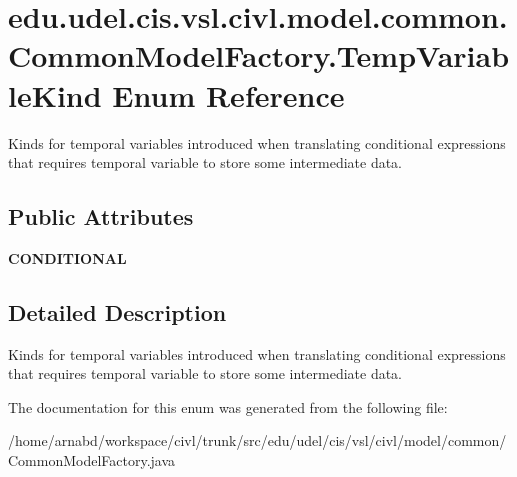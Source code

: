 \hypertarget{enumedu_1_1udel_1_1cis_1_1vsl_1_1civl_1_1model_1_1common_1_1CommonModelFactory_1_1TempVariableKind}{}\section{edu.\+udel.\+cis.\+vsl.\+civl.\+model.\+common.\+Common\+Model\+Factory.\+Temp\+Variable\+Kind Enum Reference}
\label{enumedu_1_1udel_1_1cis_1_1vsl_1_1civl_1_1model_1_1common_1_1CommonModelFactory_1_1TempVariableKind}


Kinds for temporal variables introduced when translating conditional expressions that requires temporal variable to store some intermediate data.  


\subsection*{Public Attributes}
\begin{DoxyCompactItemize}
\item 
\hypertarget{enumedu_1_1udel_1_1cis_1_1vsl_1_1civl_1_1model_1_1common_1_1CommonModelFactory_1_1TempVariableKind_a04934f670318316ea97cc25ac770aec5}{}{\bfseries C\+O\+N\+D\+I\+T\+I\+O\+N\+A\+L}\label{enumedu_1_1udel_1_1cis_1_1vsl_1_1civl_1_1model_1_1common_1_1CommonModelFactory_1_1TempVariableKind_a04934f670318316ea97cc25ac770aec5}

\end{DoxyCompactItemize}


\subsection{Detailed Description}
Kinds for temporal variables introduced when translating conditional expressions that requires temporal variable to store some intermediate data. 



The documentation for this enum was generated from the following file\+:\begin{DoxyCompactItemize}
\item 
/home/arnabd/workspace/civl/trunk/src/edu/udel/cis/vsl/civl/model/common/Common\+Model\+Factory.\+java\end{DoxyCompactItemize}
